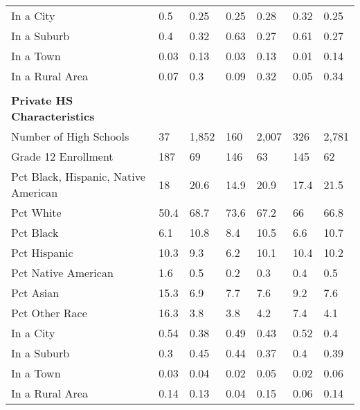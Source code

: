 \begin{longtabu}{X[4.5,l] X[1,c] X[1,c] X[1,c] X[1,c] X[1,c] X[1,c]}
\hspace{0.4cm}In a City&0.5&0.25&0.25&0.28&0.32&0.25\\%
\hspace{0.4cm}In a Suburb&0.4&0.32&0.63&0.27&0.61&0.27\\%
\hspace{0.4cm}In a Town&0.03&0.13&0.03&0.13&0.01&0.14\\%
\hspace{0.4cm}In a Rural Area&0.07&0.3&0.09&0.32&0.05&0.34\\%
&&&&&&\\%
\textbf{Private HS Characteristics}&\textbf{}&\textbf{}&\textbf{}&\textbf{}&\textbf{}&\textbf{}\\%
\hspace{0.4cm}Number of High Schools&37&1,852&160&2,007&326&2,781\\%
\hspace{0.4cm}Grade 12 Enrollment&187&69&146&63&145&62\\%
\hspace{0.4cm}Pct Black, Hispanic, Native American&18&20.6&14.9&20.9&17.4&21.5\\%
\hspace{0.4cm}Pct White&50.4&68.7&73.6&67.2&66&66.8\\%
\hspace{0.4cm}Pct Black&6.1&10.8&8.4&10.5&6.6&10.7\\%
\hspace{0.4cm}Pct Hispanic&10.3&9.3&6.2&10.1&10.4&10.2\\%
\hspace{0.4cm}Pct Native American&1.6&0.5&0.2&0.3&0.4&0.5\\%
\hspace{0.4cm}Pct Asian&15.3&6.9&7.7&7.6&9.2&7.6\\%
\hspace{0.4cm}Pct Other Race&16.3&3.8&3.8&4.2&7.4&4.1\\%
\hspace{0.4cm}In a City&0.54&0.38&0.49&0.43&0.52&0.4\\%
\hspace{0.4cm}In a Suburb&0.3&0.45&0.44&0.37&0.4&0.39\\%
\hspace{0.4cm}In a Town&0.03&0.04&0.02&0.05&0.02&0.06\\%
\hspace{0.4cm}In a Rural Area&0.14&0.13&0.04&0.15&0.06&0.14\\%
\end{longtabu}
